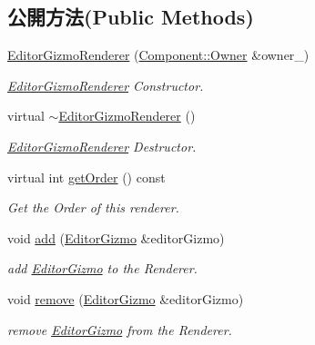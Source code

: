 \subsection*{公開方法(Public Methods)}
\begin{DoxyCompactItemize}
\item 
\hyperlink{class_i_dream_sky_1_1_editor_gizmo_renderer_aedbc41e9e363f1f864178863f94811db}{Editor\+Gizmo\+Renderer} (\hyperlink{class_i_dream_sky_1_1_component_1_1_owner}{Component\+::\+Owner} \&owner\+\_\+)
\begin{DoxyCompactList}\small\item\em \hyperlink{class_i_dream_sky_1_1_editor_gizmo_renderer}{Editor\+Gizmo\+Renderer} Constructor. \end{DoxyCompactList}\item 
virtual \hyperlink{class_i_dream_sky_1_1_editor_gizmo_renderer_a156f006706a76f89c9477d746e473ff0}{$\sim$\+Editor\+Gizmo\+Renderer} ()
\begin{DoxyCompactList}\small\item\em \hyperlink{class_i_dream_sky_1_1_editor_gizmo_renderer}{Editor\+Gizmo\+Renderer} Destructor. \end{DoxyCompactList}\item 
virtual int \hyperlink{class_i_dream_sky_1_1_editor_gizmo_renderer_ab6927ae29535aaf089d11b3e2b7f164f}{get\+Order} () const 
\begin{DoxyCompactList}\small\item\em Get the Order of this renderer. \end{DoxyCompactList}\item 
void \hyperlink{class_i_dream_sky_1_1_editor_gizmo_renderer_ae35d1752f36818f51eda0d7f0784d5f3}{add} (\hyperlink{class_i_dream_sky_1_1_editor_gizmo}{Editor\+Gizmo} \&editor\+Gizmo)
\begin{DoxyCompactList}\small\item\em add \hyperlink{class_i_dream_sky_1_1_editor_gizmo}{Editor\+Gizmo} to the Renderer. \end{DoxyCompactList}\item 
void \hyperlink{class_i_dream_sky_1_1_editor_gizmo_renderer_a0dcf079b1b9e1ec5f2eed0da99cacffa}{remove} (\hyperlink{class_i_dream_sky_1_1_editor_gizmo}{Editor\+Gizmo} \&editor\+Gizmo)
\begin{DoxyCompactList}\small\item\em remove \hyperlink{class_i_dream_sky_1_1_editor_gizmo}{Editor\+Gizmo} from the Renderer. \end{DoxyCompactList}\end{DoxyCompactItemize}
